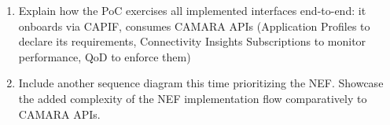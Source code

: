 {\begin{enumerate}
\begin{enumerate}
            \item the creation of connectivity insights subscription to be notified when the application requirements are not being respected
            \item  the change of \acs{QoS} profile in response to being unable to meet the application requirements or in response to a location change (CAMARA QoD API)
        \end{enumerate}
        \item Explain how the \acs{PoC} exercises all implemented interfaces end-to-end: it onboards via CAPIF, consumes CAMARA APIs (Application Profiles to declare its requirements, Connectivity Insights Subscriptions to monitor performance, QoD to enforce them)
        \item Include another sequence diagram this time prioritizing the NEF. Showcase the added complexity of the NEF implementation flow comparatively to CAMARA APIs.
    \end{enumerate}
}
